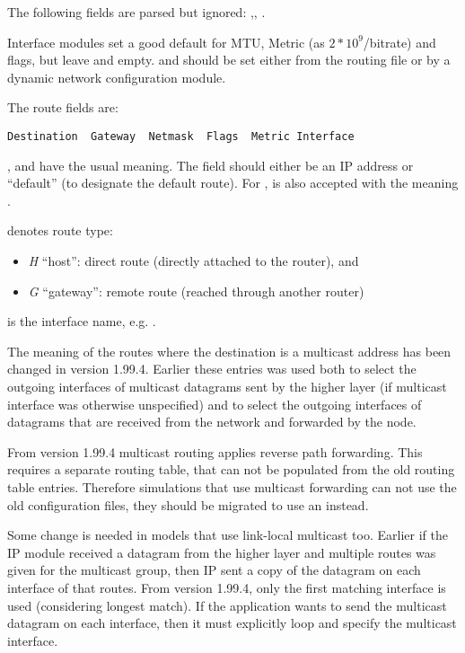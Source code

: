 The following fields are parsed but ignored: ,,
.

Interface modules set a good default for MTU, Metric (as $2*10^9$/bitrate) and
flags, but leave  and  empty.  and
 should be set either from the routing file or by a dynamic network
configuration module.

The route fields are:

\begin{verbatim}
Destination  Gateway  Netmask  Flags  Metric Interface
\end{verbatim}

,  and  have the usual meaning.
The  field should either be an IP address or ``default''
(to designate the default route). For , \ttt{*} is also
accepted with the meaning .

 denotes route type:

\begin{itemize}
  \item \textit{H} ``host'': direct route (directly attached to the router), and
  \item \textit{G} ``gateway'': remote route (reached through another router)
\end{itemize}

 is the interface name, e.g. .

\begin{important}
The meaning of the routes where the destination is a multicast address
has been changed in version 1.99.4. Earlier these entries was used
both to select the outgoing interfaces of multicast datagrams
sent by the higher layer (if multicast interface was otherwise unspecified)
and to select the outgoing interfaces of datagrams that are received from
the network and forwarded by the node.

From version 1.99.4 multicast routing applies reverse path forwarding.
This requires a separate routing table, that can not be populated from
the old routing table entries. Therefore simulations that use multicast
forwarding can not use the old configuration files, they should be
migrated to use an  instead.

Some change is needed in models that use link-local multicast too.
Earlier if the IP module received a datagram from the higher layer
and multiple routes was given for the multicast group,
then IP sent a copy of the datagram on each interface of that routes.
From version 1.99.4, only the first matching interface is used (considering
longest match). If the application wants to send the multicast datagram
on each interface, then it must explicitly loop and specify the multicast
interface.
\end{important}

